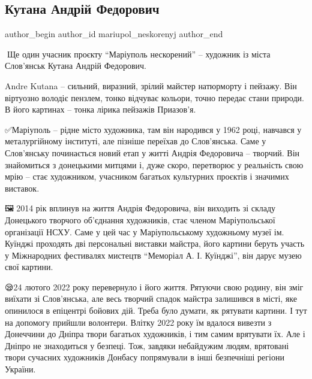  
 
 
 
 

\subsection{Кутана Андрій Федорович}
\label{sec:14_08_2023.fb.mariupol_neskorenyj.1.kutana_andrij_fedorovych}

\ifcmt
 author_begin
   author_id mariupol_neskorenyj
 author_end
\fi

📎Ще один учасник проєкту \enquote{Маріуполь нескорений} – художник із міста
Слов'янськ Кутана Андрій Федорович.

Andre Kutana – сильний, виразний, зрілий майстер натюрморту і пейзажу. Він
віртуозно володіє пензлем, тонко відчуває кольори, точно передає стани природи.
В його картинах – тонка лірика пейзажів Приазов'я.

✅️Маріуполь – рідне місто художника, там він народився у 1962 році, навчався у
металургійному інституті, але пізніше переїхав до Слов'янська. Саме у
Слов'янську починається новий етап у житті Андрія Федоровича – творчий. Він
знайомиться з донецькими митцями і, дуже скоро, перетворює у реальність свою
мрію – стає художником, учасником багатьох культурних проєктів і значимих
виставок.

🖼🎨2014 рік вплинув на життя Андрія Федоровича, він виходить зі складу
Донецького творчого об'єднання художників, стає членом Маріупольської
організації НСХУ. Саме у цей час у Маріупольському художньому музеї ім. Куїнджі
проходять дві персональні виставки майстра, його картини беруть участь у
Міжнародних фестивалях мистецтв \enquote{Меморіал А. І. Куїнджі}, він дарує музею свої
картини.

😪24 лютого 2022 року перевернуло і його життя. Рятуючи свою родину, він зміг
виїхати зі Слов’янська, але весь творчий спадок майстра залишився в місті, яке
опинилося в епіцентрі бойових дій. Треба було думати, як рятувати картини. І
тут на допомогу прийшли волонтери. Влітку 2022 року їм вдалося вивезти з
Донеччини до Дніпра твори багатьох художників, і тим самим врятувати їх. Але і
Дніпро не знаходиться у безпеці. Тож, завдяки небайдужим людям, врятовані твори
сучасних художників Донбасу попрямували в інші безпечніші регіони України.


